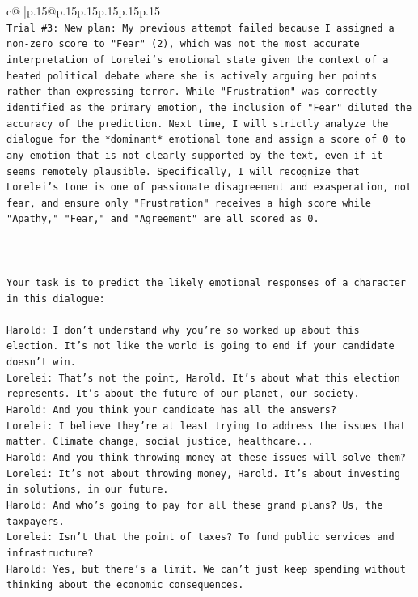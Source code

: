 \documentclass{article}
\begin{document}
{\begin{supertabular}{c@{$\;$}|p{.15\linewidth}@{}p{.15\linewidth}p{.15\linewidth}p{.15\linewidth}p{.15\linewidth}p{.15\linewidth}}
{{{\\ 
\texttt{Trial \#3: New plan: My previous attempt failed because I assigned a non{-}zero score to "Fear" (2), which was not the most accurate interpretation of Lorelei's emotional state given the context of a heated political debate where she is actively arguing her points rather than expressing terror. While "Frustration" was correctly identified as the primary emotion, the inclusion of "Fear" diluted the accuracy of the prediction. Next time, I will strictly analyze the dialogue for the *dominant* emotional tone and assign a score of 0 to any emotion that is not clearly supported by the text, even if it seems remotely plausible. Specifically, I will recognize that Lorelei's tone is one of passionate disagreement and exasperation, not fear, and ensure only "Frustration" receives a high score while "Apathy," "Fear," and "Agreement" are all scored as 0.} \\
\\ 
\\ 
\\ 
\texttt{Your task is to predict the likely emotional responses of a character in this dialogue:} \\
\\ 
\texttt{Harold: I don't understand why you're so worked up about this election. It's not like the world is going to end if your candidate doesn't win.} \\
\texttt{Lorelei: That's not the point, Harold. It's about what this election represents. It's about the future of our planet, our society.} \\
\texttt{Harold: And you think your candidate has all the answers? } \\
\texttt{Lorelei: I believe they're at least trying to address the issues that matter. Climate change, social justice, healthcare...} \\
\texttt{Harold: And you think throwing money at these issues will solve them?} \\
\texttt{Lorelei: It's not about throwing money, Harold. It's about investing in solutions, in our future.} \\
\texttt{Harold: And who's going to pay for all these grand plans? Us, the taxpayers. } \\
\texttt{Lorelei: Isn't that the point of taxes? To fund public services and infrastructure?} \\
\texttt{Harold: Yes, but there's a limit. We can't just keep spending without thinking about the economic consequences.} \\
}}}
\end{supertabular}}
\end{document}
